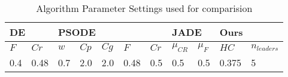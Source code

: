 \begin{table*}[htbp]
\centering
\caption{Algorithm Parameter Settings used for comparision}
\centering
\begin{tabular}{|l|l|l|l|l|l|l|l|l|l|l|}
\hline
\multicolumn{2}{|l|}{DE} & \multicolumn{5}{l|}{PSODE} & \multicolumn{2}{l|}{JADE} & \multicolumn{2}{l|}{Ours} \\ \hline
$F$  &  $Cr$  &  $w$ & $Cp$ & $Cg$ & $F$  & $Cr$ & $\mu_{CR}$ &  $\mu_{F}$  &  $HC$  &  $n_{leaders}$  \\ \hline
0.4 &  0.48 &  0.7  &  2.0 & 2.0 & 0.48 & 0.5 & 0.5  &  0.5   &  0.375  &  5 \\ \hline
\end{tabular}
\end{table*}